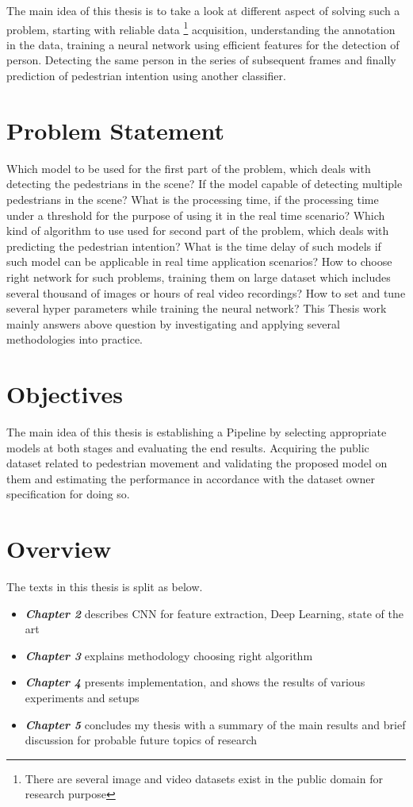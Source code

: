 \vspace{1em}
\noindent The main idea of this thesis is to take a look at different aspect of solving such a problem, 
starting with reliable data \footnote{There are several image and video datasets exist in the 
public domain for research purpose} acquisition, understanding the annotation in the data, 
training a neural network using efficient features for the detection of person. Detecting the same person in the series of subsequent frames and finally prediction of pedestrian intention using another classifier.

\section{Problem Statement} 
Which model to be used for the first part of the problem, which deals with detecting the pedestrians in the scene? If the model capable of detecting multiple pedestrians in the scene? What is the processing time, if the processing time under a threshold for the purpose of using it in the real time scenario?
Which kind of algorithm to use used for second part of the problem, which deals with predicting the pedestrian intention? What is the time delay of such models if such model can be applicable in real time application scenarios?
How to choose right network for such problems, training them on large dataset which includes several thousand of images or hours of real video recordings? How to set and tune several hyper parameters while training the neural network? This Thesis work mainly answers above question by investigating and  applying several methodologies into practice.

\section{Objectives}
The main idea of this thesis is establishing a Pipeline by selecting appropriate models at both stages and evaluating the end results. Acquiring the public dataset related to pedestrian movement and validating the proposed model on them and estimating the performance in accordance with the dataset owner specification for doing so.

\section{Overview}
The texts in this thesis is split as below.
\begin{itemize}
  \item {\textbf {\textit{Chapter 2}} describes CNN for feature extraction, Deep Learning, state of the art}
  \item {\textbf {\textit{Chapter 3}} explains methodology choosing right algorithm}
	\item {\textbf {\textit{Chapter 4}} presents implementation, and shows the results of various experiments and setups  }
	\item {\textbf {\textit{Chapter 5}} concludes my thesis with a summary of the main results and brief discussion for probable future topics of research}
\end{itemize}